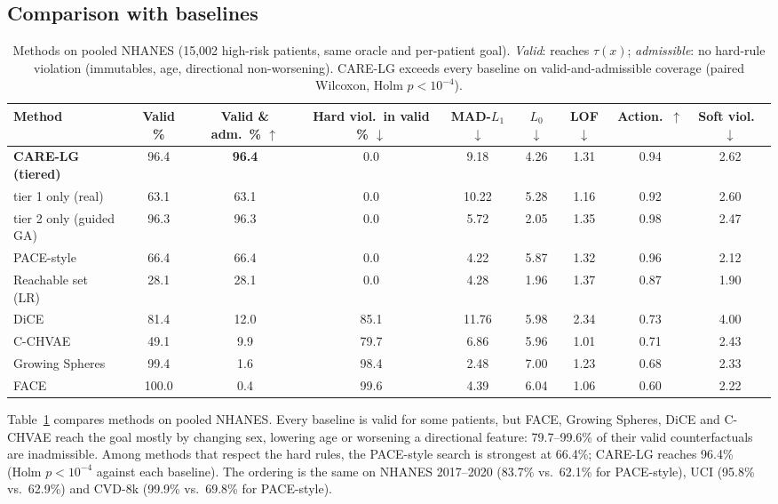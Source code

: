 \documentclass[conference]{IEEEtran}
\newcommand{\method}{CARE-LG}
\begin{document}
\subsection{Comparison with baselines}
\begin{table}[t]
\centering
\caption{Methods on pooled NHANES (15,002 high-risk patients, same oracle and per-patient goal). \emph{Valid}: reaches $\tau(x)$; \emph{admissible}: no hard-rule violation (immutables, age, directional non-worsening). \method{} exceeds every baseline on valid-and-admissible coverage (paired Wilcoxon, Holm $p<10^{-4}$).}
\label{tab:methods}
\footnotesize
\setlength{\tabcolsep}{4pt}
\begin{tabular}{@{}lcccccccc@{}}
\toprule
Method & Valid \% & Valid \& adm.\ \% $\uparrow$ & Hard viol.\ in valid \% $\downarrow$ & MAD-$L_1$ $\downarrow$ & $L_0$ $\downarrow$ & LOF $\downarrow$ & Action.\ $\uparrow$ & Soft viol.\ $\downarrow$ \\
\midrule
\textbf{\method{} (tiered)} & 96.4 & \textbf{96.4} & 0.0 & 9.18 & 4.26 & 1.31 & 0.94 & 2.62 \\
\quad tier 1 only (real) & 63.1 & 63.1 & 0.0 & 10.22 & 5.28 & 1.16 & 0.92 & 2.60 \\
\quad tier 2 only (guided GA) & 96.3 & 96.3 & 0.0 & 5.72 & 2.05 & 1.35 & 0.98 & 2.47 \\
\midrule
PACE-style~\cite{pace2026} & 66.4 & 66.4 & 0.0 & 4.22 & 5.87 & 1.32 & 0.96 & 2.12 \\
Reachable set (LR)~\cite{kothari2024reach} & 28.1 & 28.1 & 0.0 & 4.28 & 1.96 & 1.37 & 0.87 & 1.90 \\
DiCE~\cite{mothilal2020dice} & 81.4 & 12.0 & 85.1 & 11.76 & 5.98 & 2.34 & 0.73 & 4.00 \\
C-CHVAE~\cite{pawelczyk2020cchvae} & 49.1 & 9.9 & 79.7 & 6.86 & 5.96 & 1.01 & 0.71 & 2.43 \\
Growing Spheres~\cite{laugel2018growing} & 99.4 & 1.6 & 98.4 & 2.48 & 7.00 & 1.23 & 0.68 & 2.33 \\
FACE~\cite{poyiadzi2020face} & 100.0 & 0.4 & 99.6 & 4.39 & 6.04 & 1.06 & 0.60 & 2.22 \\
\bottomrule
\end{tabular}
\end{table}

Table~\ref{tab:methods} compares methods on pooled NHANES. Every baseline is valid for some patients, but FACE, Growing Spheres, DiCE and C-CHVAE reach the goal mostly by changing sex, lowering age or worsening a directional feature: 79.7--99.6\% of their valid counterfactuals are inadmissible. Among methods that respect the hard rules, the PACE-style search is strongest at 66.4\%; \method{} reaches 96.4\% (Holm $p<10^{-4}$ against each baseline). The ordering is the same on NHANES 2017--2020 (83.7\% vs.\ 62.1\% for PACE-style), UCI (95.8\% vs.\ 62.9\%) and CVD-8k (99.9\% vs.\ 69.8\% for PACE-style).
\end{document}
